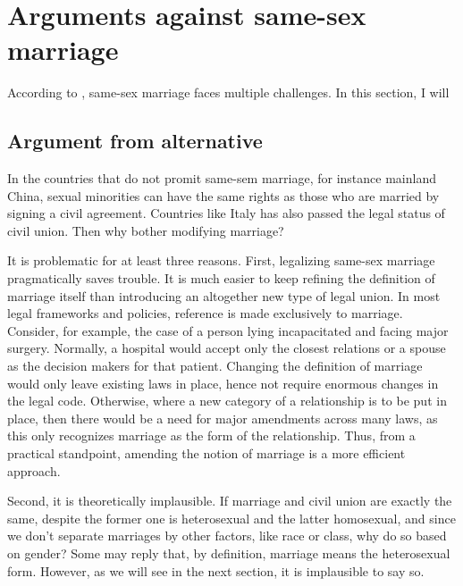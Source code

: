 \documentclass{article}
\begin{document}
\section{Arguments against same-sex marriage}

According to \textcite{brakeMarriageDomesticPartnership2023}, same-sex marriage faces multiple challenges. In this section, I will 

\subsection{Argument from alternative}
\label{alternative}

In the countries that do not promit same-sem marriage, for instance mainland China, sexual minorities can have the same rights as those who are married by signing a civil agreement. Countries like Italy has also passed the legal status of civil union.\autocite{povoledoItalyApprovesSameSex2016} Then why bother modifying marriage? 

It is problematic for at least three reasons. First, legalizing same-sex marriage pragmatically saves trouble. It is much easier to keep refining the definition of marriage itself than introducing an altogether new type of legal union. In most legal frameworks and policies, reference is made exclusively to marriage. Consider, for example, the case of a person lying incapacitated and facing major surgery. Normally, a hospital would accept only the closest relations or a spouse as the decision makers for that patient. Changing the definition of marriage would only leave existing laws in place, hence not require enormous changes in the legal code. Otherwise, where a new category of a relationship is to be put in place, then there would be a need for major amendments across many laws, as this only recognizes marriage as the form of the relationship. Thus, from a practical standpoint, amending the notion of marriage is a more efficient approach. 

Second, it is theoretically implausible. If marriage and civil union are exactly the same, despite the former one is heterosexual and the latter homosexual, and since we don't separate marriages by other factors, like race or class, why do so based on gender? Some may reply that, by definition, marriage means the heterosexual form. However, as we will see in the next section, it is implausible to say so. 
\end{document}
